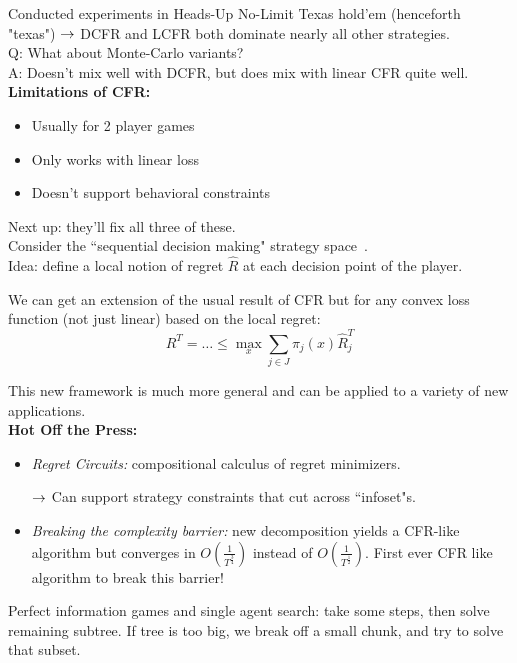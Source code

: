 Conducted experiments in Heads-Up No-Limit Texas hold'em (henceforth "texas") $\rightarrow$ DCFR and LCFR both dominate nearly all other strategies. \\

Q: What about Monte-Carlo variants? \\

A: Doesn't mix well with DCFR, but does mix with linear CFR quite well. \\

{\bf Limitations of CFR:}
\begin{itemize}
    \item Usually for 2 player games
    \item Only works with linear loss
    \item Doesn't support behavioral constraints
\end{itemize}
Next up: they'll fix all three of these. \\

Consider the ``sequential decision making" strategy space~\cite{farina2018online}. \\

Idea: define a local notion of regret $\hat{R}$ at each decision point of the player.

\begin{theorem}
We can get an extension of the usual result of CFR but for any convex loss function (not just linear) based on the local regret:
\[
R^T = \ldots \leq \max_x \sum_{j \in J} \pi_j(x) \hat{R}_j^T
\]
\end{theorem}

This new framework is much more general and can be applied to a variety of new applications. \\

{\bf Hot Off the Press:}
\begin{itemize}
    \item {\it Regret Circuits:} compositional calculus of regret minimizers.
    
    $\rightarrow$ Can support strategy constraints that cut across ``infoset"s.
    
    \item {\it Breaking the complexity barrier:} new decomposition yields a CFR-like algorithm but converges in $O\left(\frac{1}{T^{\frac{3}{4}}}\right)$ instead of $O\left(\frac{1}{T^{\frac{1}{2}}}\right)$. First ever CFR like algorithm to break this barrier!
\end{itemize}

Perfect information games and single agent search: take some steps, then solve remaining subtree. If tree is too big, we break off a small chunk, and try to solve that subset. \\

